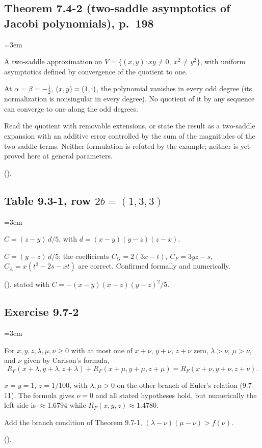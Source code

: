 \documentclass[11pt,a4paper]{article}
\newcommand{\entry}[1]{\par\addvspace{1.5ex}\needspace{5\baselineskip}%
  \subsection{#1}}
\newenvironment{fields}{\begin{description}[font=\normalfont\itshape,
  leftmargin=1.5em, labelindent=0pt, itemsep=0.4ex, topsep=0.3ex, parsep=0.3ex]%
  \setlength{\parindent}{0pt}\RaggedRight\emergencystretch=3em}{\end{description}}
\newcommand{\RF}{R_F}
\begin{document}
\entry{Theorem 7.4-2 (two-saddle asymptotics of Jacobi polynomials), p.~198}
\begin{fields}
\item[As printed] A two-saddle approximation on
  $V=\{(x,y): xy\ne0,\ x^2\ne y^2\}$, with uniform asymptotics defined by convergence of the
  quotient to one.
\item[Problem] At $\alpha=\beta=-\tfrac12$, $(x,y)=(1,\mathrm{i})$, the polynomial vanishes in every
  odd degree (its normalization is nonsingular in every degree). No quotient of it by any
  sequence can converge to one along the odd degrees.
\item[Correction] Read the quotient with removable extensions, or state the result as a
  two-saddle expansion with an additive error controlled by the sum of the magnitudes of the
  two saddle terms. Neither formulation is refuted by the example; neither is yet proved here
  at general parameters.
\item[Lean] 
  ().
\end{fields}

\entry{Table 9.3-1, row $2b=(1,3,3)$}
\begin{fields}
\item[As printed] $C=(z-y)\,d/5$, with $d=(x-y)(y-z)(z-x)$.
\item[Correction] $C=(y-z)\,d/5$; the coefficients $C_G=2(3x-t)$, $C_F=3yz-s$,
  $C_A=x(t^2-2s-xt)$ are correct. Confirmed formally and numerically.
\item[Lean]  (),
  stated with $C=-(x-y)(x-z)(y-z)^2/5$.
\end{fields}

\entry{Exercise 9.7-2}
\begin{fields}
\item[As stated] For $x,y,z,\lambda,\mu,\nu\ge0$ with at most one of $x+\nu$, $y+\nu$, $z+\nu$
  zero, $\lambda>\nu$, $\mu>\nu$, and $\nu$ given by Carlson's formula,
  \[
    \RF(x+\lambda,y+\lambda,z+\lambda)+\RF(x+\mu,y+\mu,z+\mu)=\RF(x+\nu,y+\nu,z+\nu).
  \]
\item[Counterexample] $x=y=1$, $z=1/100$, with $\lambda,\mu>0$ on the other branch of Euler's
  relation (9.7-11). The formula gives $\nu=0$ and all stated hypotheses hold, but numerically
  the left side is $\approx1.6794$ while $\RF(x,y,z)\approx1.4780$.
\item[Correction] Add the branch condition of Theorem 9.7-1, $(\lambda-\nu)(\mu-\nu)>f(\nu)$.
\item[Lean] 
  ().
\end{fields}
\end{document}
